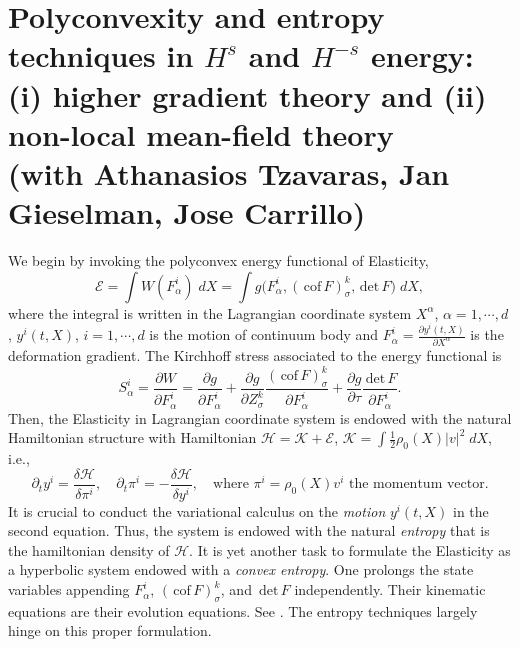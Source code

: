 \documentclass[a4paper,11pt]{article}
\def\red{\color{red}}
\def\div{\,\textrm{div}\,}
\def\cof{\,\textrm{cof}\,}
\def\det{\,\textrm{det}\,}
\def\K{\mathcal{K}}
\def\E{\mathcal{E}}
\def\H{\mathcal{H}}
\begin{document}
\section{Polyconvexity and entropy techniques in $H^s$ and $H^{-s}$ energy: (i) higher gradient theory and (ii) non-local mean-field theory \\{\small (with Athanasios Tzavaras, Jan Gieselman, Jose Carrillo)}}
We begin by invoking the polyconvex energy functional of  Elasticity,
\begin{equation}
 \mathcal{E} = \int W(F^i_\alpha) \; dX =  \int g\Big(F^i_\alpha, (\cof F)^{k}_\sigma, \det F\Big) \; dX,
\end{equation}
where the integral is written in the Lagrangian coordinate system $X^\alpha$, $\alpha=1,\cdots,d$, $y^i(t,X)$, $i=1,\cdots,d$ is the motion of continuum body and $\displaystyle F^i_\alpha = \frac{\partial y^i(t,X)}{\partial X^\alpha}$ is the deformation gradient. The Kirchhoff stress associated to the energy functional is
\begin{equation}
 S^{i}_\alpha = \frac{\partial W}{\partial F^i_\alpha} = \frac{\partial g}{\partial F^i_\alpha} + \frac{\partial g}{\partial Z^k_\sigma}\frac{(\cof F)^{k}_\sigma}{\partial F^i_\alpha} + \frac{\partial g}{\partial \tau}\frac{\det F}{\partial F^i_\alpha}.
\end{equation}
Then, the Elasticity in Lagrangian coordinate system
is endowed with the natural Hamiltonian structure with Hamiltonian $\H = \K + \E$, $\displaystyle \K = \int \frac{1}{2} \rho_0(X) |v|^2 \; dX$, i.e.,
\begin{equation} \label{eq:elasticity_ham}
    \partial_t y^i = \frac{\delta \H}{\delta \pi^i},\quad
    \partial_t \pi^i = -\frac{\delta \H}{\delta y^i}, \quad\text{where $\pi^i = \rho_0(X)v^i$ the momentum vector}.
\end{equation}
It is crucial to conduct the variational calculus on the {\it motion} $y^i(t,X)$ in the second equation. Thus, the system is endowed with the natural {\it entropy} that is the hamiltonian density of $\H$. It is yet another task to formulate the Elasticity as a hyperbolic system endowed with a {\it convex entropy}. One prolongs the state variables appending $F^i_\alpha$, $(\cof F)^{k}_\sigma$, and $\det F$ independently. Their kinematic equations are their evolution equations. See \cite{demoulini_variational_2001}. The entropy techniques largely hinge on this proper formulation.
\end{document}
